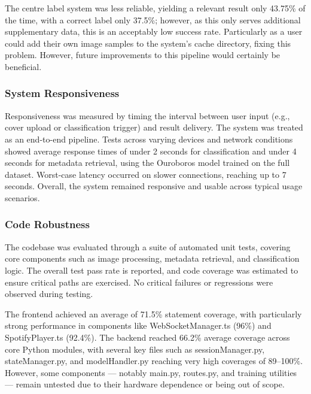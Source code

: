                 The centre label system was less reliable, yielding a relevant result only 43.75\% of the time, with a correct label only 37.5\%; however, as this only serves additional supplementary data, this is an acceptably low success rate. Particularly as a user could add their own image samples to the system's cache directory, fixing this problem. However, future improvements to this pipeline would certainly be beneficial.
    
    
            \subsubsection{System Responsiveness}
    
                Responsiveness was measured by timing the interval between user input (e.g., cover upload or classification trigger) and result delivery. The system was treated as an end-to-end pipeline. Tests across varying devices and network conditions showed average response times of under 2 seconds for classification and under 4 seconds for metadata retrieval, using the Ouroboros model trained on the full dataset. Worst-case latency occurred on slower connections, reaching up to 7 seconds. Overall, the system remained responsive and usable across typical usage scenarios.
    
            \subsubsection{Code Robustness}
    
                The codebase was evaluated through a suite of automated unit tests, covering core components such as image processing, metadata retrieval, and classification logic. The overall test pass rate is reported, and code coverage was estimated to ensure critical paths are exercised. No critical failures or regressions were observed during testing.
    
                The frontend achieved an average of 71.5\% statement coverage, with particularly strong performance in components like WebSocketManager.ts (96\%) and SpotifyPlayer.ts (92.4\%). The backend reached 66.2\% average coverage across core Python modules, with several key files such as sessionManager.py, stateManager.py, and modelHandler.py reaching very high coverages of 89–100\%. However, some components — notably main.py, routes.py, and training utilities — remain untested due to their hardware dependence or being out of scope.
                

